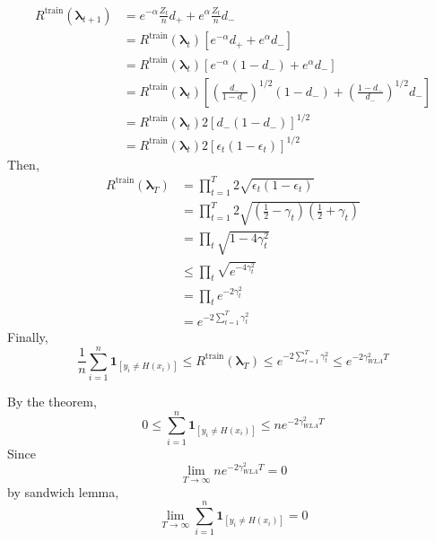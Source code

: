 \documentclass{article}
\begin{document}
\begin{equation}\begin{aligned}
R^{\operatorname{train}}\left(\boldsymbol{\lambda}_{t+1}\right)&=e^{-\alpha} \frac{Z_{t}}{n} d_{+}+e^{\alpha} \frac{Z_{t}}{n} d_{-}\\
&=R^{\operatorname{train}}\left(\boldsymbol{\lambda}_{t}\right)\left[e^{-\alpha} d_{+}+e^{\alpha} d_{-}\right] \\
&=R^{\operatorname{train}}\left(\boldsymbol{\lambda}_{t}\right)\left[e^{-\alpha}\left(1-d_{-}\right)+e^{\alpha} d_{-}\right]\\
&=R^{\operatorname{train}}\left(\boldsymbol{\lambda}_{t}\right)\left[\left(\frac{d_{-}}{1-d_{-}}\right)^{1 / 2}\left(1-d_{-}\right)+\left(\frac{1-d_{-}}{d_{-}}\right)^{1 / 2} d_{-}\right] \\
&=R^{\operatorname{train}}\left(\boldsymbol{\lambda}_{t}\right) 2\left[d_{-}\left(1-d_{-}\right)\right]^{1 / 2} \\
&=R^{\operatorname{train}}\left(\boldsymbol{\lambda}_{t}\right) 2\left[\epsilon_{t}\left(1-\epsilon_{t}\right)\right]^{1 / 2}
\end{aligned}\end{equation}
Then,
\begin{equation}\begin{aligned}
R^{\operatorname{train}}\left(\boldsymbol{\lambda}_{T}\right)&=\prod_{t=1}^{T} 2 \sqrt{\epsilon_{t}\left(1-\epsilon_{t}\right)}\\
&= \prod_{t=1}^{T} 2 \sqrt{\left(\frac{1}{2}-\gamma_{t}\right)\left(\frac{1}{2}+\gamma_{t}\right)}\\
&= \prod_{t} \sqrt{1-4 \gamma_{t}^{2}}\\
&\leq \prod_{t} \sqrt{e^{-4 \gamma_{t}^{2}}}\\
&=\prod_{t} e^{-2 \gamma_{t}^{2}}\\
&=e^{-2 \sum_{t=1}^{T} \gamma_{t}^{2}}
\end{aligned}\end{equation}
Finally,
\begin{equation}\frac{1}{n} \sum_{i=1}^{n} \mathbf{1}_{\left[y_{i} \neq H\left(x_{i}\right)\right]} \leq R^{\operatorname{train}}\left(\boldsymbol{\lambda}_{T}\right) \leq e^{-2 \sum_{t=1}^{T} \gamma_{t}^{2}} \leq e^{-2 \gamma_{W L A}^{2} T}\end{equation}

By the theorem,
\begin{equation}
 0 \leq \sum_{i=1}^{n} \mathbf{1}_{\left[y_{i} \neq H\left(x_{i}\right)\right]} \leq  n e^{-2 \gamma_{W L A}^{2} T}
\end{equation}
Since
\begin{equation}
\lim_{T \rightarrow \infty} n e^{-2 \gamma_{W L A}^{2} T} = 0
\end{equation}
by sandwich lemma,
\begin{equation}
 \lim_{T \rightarrow \infty} \sum_{i=1}^{n} \mathbf{1}_{\left[y_{i} \neq H\left(x_{i}\right)\right]} = 0
\end{equation}
\end{document}
